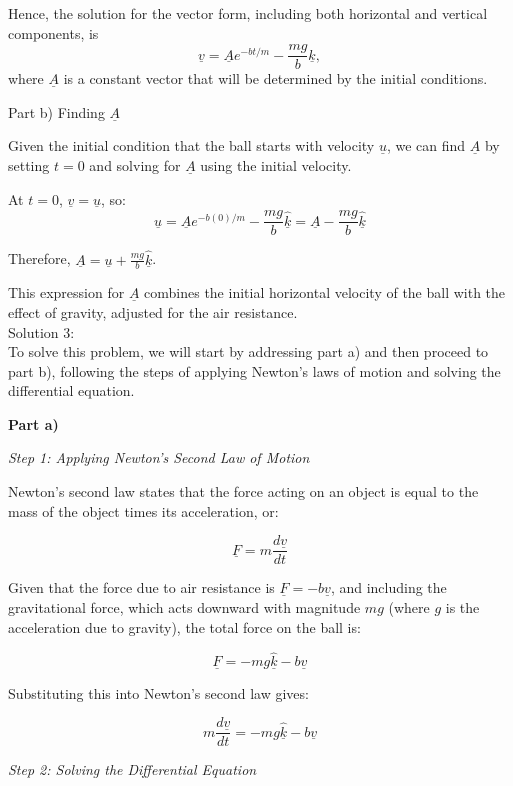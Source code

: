 \documentclass[a4paper,11pt]{article}
\begin{document}
Hence, the solution for the vector form, including both horizontal and vertical components, is
\[
\underline{v} = \underline{A} e^{-bt/m} - \frac{mg}{b} \hat{\underline{k}},
\]
where \( \underline{A} \) is a constant vector that will be determined by the initial conditions.

Part b) Finding \( \underline{A} \)

Given the initial condition that the ball starts with velocity \( \underline{u} \), we can find \( \underline{A} \) by setting \( t = 0 \) and solving for \( \underline{A} \) using the initial velocity.

At \( t = 0 \), \( \underline{v} = \underline{u} \), so:
\[
\underline{u} = \underline{A} e^{-b(0)/m} - \frac{mg}{b} \hat{\underline{k}} = \underline{A} - \frac{mg}{b} \hat{\underline{k}}
\]

Therefore, \( \underline{A} = \underline{u} + \frac{mg}{b} \hat{\underline{k}} \).

This expression for \( \underline{A} \) combines the initial horizontal velocity of the ball with the effect of gravity, adjusted for the air resistance. \\

\noindent Solution 3: \\

To solve this problem, we will start by addressing part a) and then proceed to part b), following the steps of applying Newton's laws of motion and solving the differential equation.

\textbf{Part a)}

\textit{Step 1: Applying Newton's Second Law of Motion}

Newton's second law states that the force acting on an object is equal to the mass of the object times its acceleration, or:

\[ \underline{F} = m \frac{d\underline{v}}{dt} \]

Given that the force due to air resistance is \(\underline{F} = -b\underline{v}\), and including the gravitational force, which acts downward with magnitude \(mg\) (where \(g\) is the acceleration due to gravity), the total force on the ball is:

\[ \underline{F} = - mg \hat{\underline{k}} - b\underline{v} \]

Substituting this into Newton's second law gives:

\[ m\frac{d\underline{v}}{dt} = - mg \hat{\underline{k}} - b\underline{v} \]

\textit{Step 2: Solving the Differential Equation}
\end{document}
